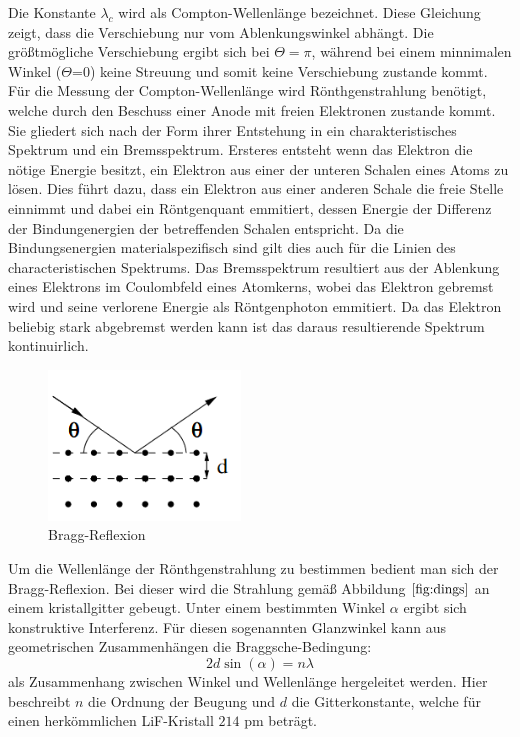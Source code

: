 Die Konstante $\lambda_c$ wird als Compton-Wellenlänge bezeichnet. Diese Gleichung zeigt, dass die Verschiebung nur
vom Ablenkungswinkel abhängt. Die größtmögliche Verschiebung ergibt sich bei $\Theta=\pi$, während bei einem minnimalen Winkel ($\Theta$=0) keine Streuung und somit keine Verschiebung zustande kommt. \\
Für die Messung der Compton-Wellenlänge wird Rönthgenstrahlung benötigt, welche durch den Beschuss einer Anode mit freien Elektronen zustande kommt. Sie gliedert sich nach der Form ihrer Entstehung in ein charakteristisches Spektrum und ein Bremsspektrum. Ersteres entsteht wenn das Elektron die nötige Energie besitzt, ein Elektron aus einer der unteren Schalen eines Atoms zu lösen. Dies führt dazu, dass ein Elektron aus einer anderen Schale die freie Stelle einnimmt und dabei ein Röntgenquant emmitiert, dessen Energie der Differenz der Bindungenergien der betreffenden Schalen entspricht. Da die Bindungsenergien materialspezifisch sind gilt dies auch für die Linien des characteristischen Spektrums.
Das Bremsspektrum resultiert aus der Ablenkung eines Elektrons im Coulombfeld eines Atomkerns, wobei das Elektron gebremst wird und seine verlorene Energie als Röntgenphoton emmitiert. Da das Elektron beliebig stark abgebremst werden kann ist das daraus resultierende Spektrum kontinuirlich. \\
\begin{figure} [h!]
    \centering
    \includegraphics[height=4cm, keepaspectratio]{Bragg-Reflexion}
    \caption{Bragg-Reflexion}
    \label{fig:dings}
 \end{figure}
Um die Wellenlänge der Rönthgenstrahlung zu bestimmen bedient man sich der Bragg-Reflexion. Bei dieser wird die Strahlung gemäß Abbildung $\ref{fig:dings}$ an einem kristallgitter gebeugt. Unter einem bestimmten Winkel $\alpha$ ergibt sich konstruktive Interferenz. Für diesen sogenannten Glanzwinkel kann aus geometrischen Zusammenhängen die Braggsche-Bedingung:
\begin{equation}
2d\sin(\alpha)=n\lambda
\end{equation}
als Zusammenhang zwischen Winkel und Wellenlänge hergeleitet werden. Hier beschreibt $n$ die Ordnung der Beugung und $d$ die Gitterkonstante, welche für einen herkömmlichen LiF-Kristall $214$ pm beträgt. \\
